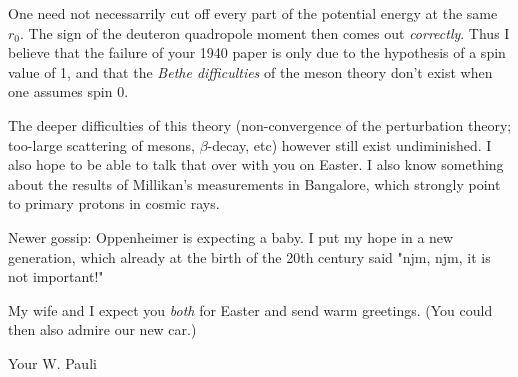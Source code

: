One need not necessarrily cut off every part of the potential energy at the same $r_0$. The sign of the deuteron quadropole moment then comes out \textit{correctly}. Thus I believe that the failure of your 1940 paper is only due to the hypothesis of a spin value of 1, and that the \textit{Bethe difficulties} of the meson theory don't exist when one assumes spin 0.

The deeper difficulties of this theory (non-convergence of the perturbation theory; too-large scattering of mesons, $\beta$-decay, etc) however still exist undiminished. I also hope to be able to talk that over with you on Easter. I also know something about the results of Millikan's measurements in Bangalore, which strongly point to primary protons in cosmic rays.

Newer gossip: Oppenheimer is expecting a baby. I put my hope in a new generation, which already at the birth of the 20th century said "njm, njm, it is not important!"

My wife and I expect you \textit{both} for Easter and send warm greetings. (You could then also admire our new car.)

Your W. Pauli

